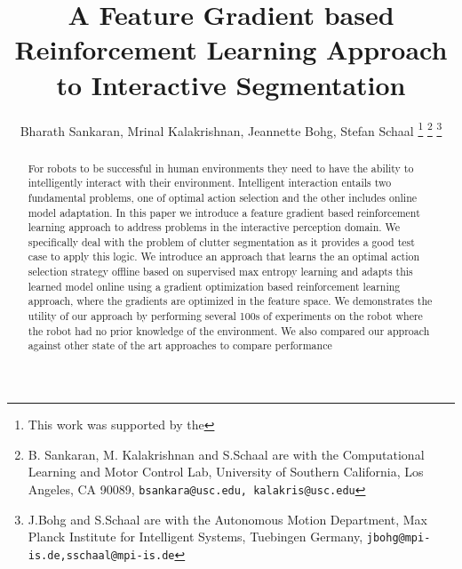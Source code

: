 \documentclass[letterpaper, 10pt, conference]{ieeeconf}
\begin{document}
\title{\LARGE \bf A Feature Gradient based Reinforcement Learning Approach to Interactive Segmentation}

\author{Bharath Sankaran, Mrinal Kalakrishnan, Jeannette Bohg, Stefan Schaal%
\thanks{This work was supported by the }%
\thanks{B. Sankaran, M. Kalakrishnan and S.Schaal are with the Computational Learning and Motor Control Lab, University of Southern California, Los Angeles, CA 90089, {\tt\small bsankara@usc.edu, kalakris@usc.edu}}%
\thanks{J.Bohg and S.Schaal are with the Autonomous Motion Department, Max Planck Institute for Intelligent Systems, Tuebingen Germany, {\tt\small jbohg@mpi-is.de,sschaal@mpi-is.de}}%
}
\maketitle


\begin{abstract}
For robots to be successful in human environments they need to have the ability to intelligently interact with their environment. Intelligent interaction entails two fundamental problems, one of optimal action selection and the other includes online model adaptation. 
In this paper we introduce a feature gradient based reinforcement learning approach to address problems in the interactive perception domain. We specifically deal with the problem of clutter segmentation as it provides a good test case to apply this logic. We introduce an approach that learns the an optimal action selection strategy offline based on 
supervised max entropy learning and adapts this learned model online using a gradient optimization based reinforcement learning approach, where the gradients are optimized in the feature space. We demonstrates the utility of our approach by performing several 100s of experiments on the robot where the robot had no prior knowledge of the environment.
We also compared our approach against other state of the art approaches to compare performance
\end{abstract}


\end{document}
